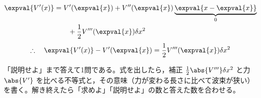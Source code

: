 \begin{align*}
\expval{V'(x)}&=V'(\expval{x})+V''(\expval{x})\underbrace{\expval{x-\expval{x}}}_{0}\\
&\qquad+\frac{1}{2}V'''(\expval{x})\delta x^{2}
\end{align*}
\[ \therefore\quad\expval{V'(x)}-V'(\expval{x})=\frac{1}{2}V'''(\expval{x})\delta x^{2} \]
\item {} 「説明せよ」まで答えて1問である。式を出したら，補正 $\frac{1}{2}\abs{V'''}\delta x^{2}$ と力 $\abs{V'}$ を比べる不等式と，その意味（力が変わる長さに比べて波束が狭い）を書く。解き終えたら「求めよ」「説明せよ」の数と答えた数を合わせる。

